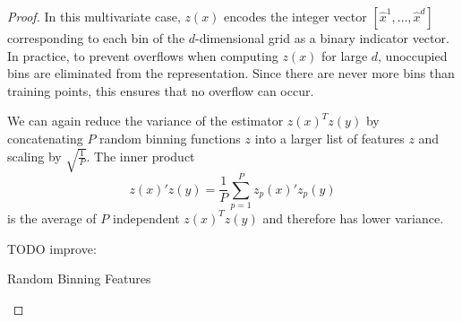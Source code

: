 \begin{proof}
  In this multivariate case, $z(x)$ encodes the integer vector $[\hat{x}^1, \dots, \hat{x}^d]$ corresponding to each bin of the $d$-dimensional grid as a binary indicator vector. In practice, to prevent overflows when computing $z(x)$ for large $d$, unoccupied bins are eliminated from the representation. Since there are never more bins than training points, this ensures that no overflow can occur.

  We can again reduce the variance of the estimator $z(x)^Tz(y)$ by concatenating $P$ random binning functions $z$ into a larger list of features $z$ and scaling by $\sqrt{\frac{1}{P}}$. The inner product 
  \begin{equation}
    z(x)'z(y) = \frac{1}{P}\sum_{p=1}^P z_p(x)'z_p(y)
  \end{equation}
 is the average of $P$ independent $z(x)^Tz(y)$ and therefore has lower variance.

TODO improve: 


\begin{algorithm}[hbt!]
    \caption{Random Binning Features}\label{alg:RandomBinning Features}
    \end{algorithm}





\end{proof}
